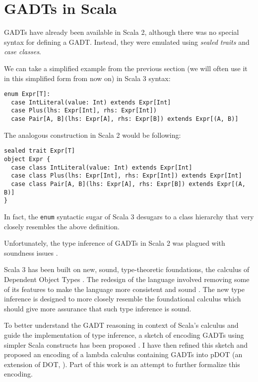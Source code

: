 \section{GADTs in Scala}

GADTs have already been available in Scala 2, although there was no special syntax for defining a GADT. Instead, they were emulated using \textit{sealed traits} and \textit{case classes}.

We can take a simplified example from the previous section (we will often use it in this simplified form from now on) in Scala 3 syntax:

\begin{verbatim}
enum Expr[T]:
  case IntLiteral(value: Int) extends Expr[Int]
  case Plus(lhs: Expr[Int], rhs: Expr[Int])
  case Pair[A, B](lhs: Expr[A], rhs: Expr[B]) extends Expr[(A, B)]
\end{verbatim}

The analogous construction in Scala 2 would be following:

\begin{verbatim}
sealed trait Expr[T]
object Expr {
  case class IntLiteral(value: Int) extends Expr[Int]
  case class Plus(lhs: Expr[Int], rhs: Expr[Int]) extends Expr[Int]
  case class Pair[A, B](lhs: Expr[A], rhs: Expr[B]) extends Expr[(A, B)]
}
\end{verbatim}

In fact, the \texttt{enum} syntactic sugar of Scala 3 desugars to a class hierarchy that very closely resembles the above definition.

Unfortunately, the type inference of GADTs in Scala 2 was plagued with soundness issues \cite{Towards}. 


Scala 3 has been built on new, sound, type-theoretic foundations, the calculus of Dependent Object Types \cite{EssenceDOT}. The redesign of the language involved removing some of its features to make the language more consistent and sound . The new type inference is designed to more closely resemble the foundational calculus which should give more assurance that such type inference is sound.

To better understand the GADT reasoning in context of Scala's calculus and guide the implementation of type inference, a sketch of encoding GADTs using simpler Scala constructs has been proposed \cite{Towards}. I have then refined this sketch and proposed an encoding \cite{myreport:277075}  of a lambda calculus containing GADTs into pDOT (an extension of DOT, \cite{pDOT}). Part of this work is an attempt to further formalize this encoding.

